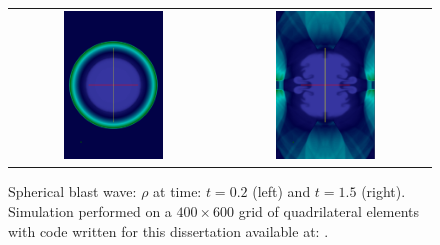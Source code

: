 \begin{figure}[htbp]\figSpace 
\begin{tabular}{cc}
\includegraphics[width=0.5\textwidth]{fig/blast_wave_0020.png} & 
\includegraphics[width=0.5\textwidth]{fig/blast_wave_0150.png} 
\end{tabular}
\caption{Spherical blast wave: $\rho$ at time: $t=0.2$ (left) and $t=1.5$ (right).  Simulation performed on a $400 \times 600$ grid of quadrilateral elements with code written for this dissertation available at: \protect\gitrepo.}
\label{fig:blast_wave}
\figSpace
\end{figure}

